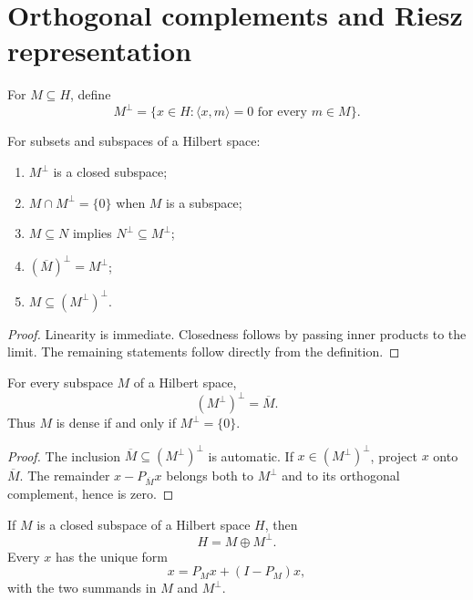 \section{Orthogonal complements and Riesz representation}

\begin{notedefinition}
For $M\subseteq H$, define
\[
  M^\perp=\{x\in H:\langle x,m\rangle=0\text{ for every }m\in M\}.
\]
\end{notedefinition}

\begin{notetheorem}
For subsets and subspaces of a Hilbert space:
\begin{enumerate}
  \item $M^\perp$ is a closed subspace;
  \item $M\cap M^\perp=\{0\}$ when $M$ is a subspace;
  \item $M\subseteq N$ implies $N^\perp\subseteq M^\perp$;
  \item $(\overline M)^\perp=M^\perp$;
  \item $M\subseteq(M^\perp)^\perp$.
\end{enumerate}
\end{notetheorem}

\begin{proof}
Linearity is immediate.  Closedness follows by passing inner products to the
limit.  The remaining statements follow directly from the definition.
\end{proof}

\begin{notetheorem}
For every subspace $M$ of a Hilbert space,
\[
  (M^\perp)^\perp=\overline M.
\]
Thus $M$ is dense if and only if $M^\perp=\{0\}$.
\end{notetheorem}

\begin{proof}
The inclusion $\overline M\subseteq(M^\perp)^\perp$ is automatic.  If
$x\in(M^\perp)^\perp$, project $x$ onto $\overline M$.  The remainder
$x-P_{\overline M}x$ belongs both to $M^\perp$ and to its orthogonal
complement, hence is zero.
\end{proof}

\begin{notetheorem}
If $M$ is a closed subspace of a Hilbert space $H$, then
\[
  H=M\oplus M^\perp.
\]
Every $x$ has the unique form
\[
  x=P_Mx+(I-P_M)x,
\]
with the two summands in $M$ and $M^\perp$.
\end{notetheorem}

